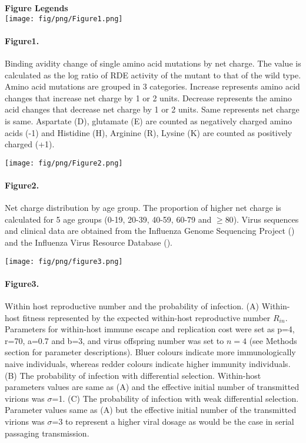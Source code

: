 \documentclass[12pt,a4paper]{article}
\begin{document}
{\bf Figure Legends} \\

\texttt{[image: fig/png/Figure1.png]}
\paragraph*{Figure1.}
\label{Fig1}
Binding avidity change of single amino acid mutations by net charge. The value is calculated as the log ratio of RDE activity of the mutant to that of the wild type. Amino acid mutations are grouped in 3 categories. Increase represents amino acid changes that increase net charge by 1 or 2 units. Decrease represents the amino acid changes that decrease net charge by 1 or 2 units. Same represents net charge is same. Aspartate (D), glutamate (E) are counted as negatively charged amino acids (-1) and Histidine (H), Arginine (R), Lysine (K) are counted as positively charged (+1).
\clearpage


\texttt{[image: fig/png/Figure2.png]} 
\paragraph*{Figure2.}
\label{Fig2}
Net charge distribution by age group. The proportion of higher net charge is calculated for 5 age groups (0-19, 20-39, 40-59, 60-79 and $\geq80$). Virus sequences and clinical data are obtained from the Influenza Genome Sequencing Project (\cite{Ghedin2005}) and the Influenza Virus Resource Database (\cite{Bao2008}). 
\clearpage

\texttt{[image: fig/png/figure3.png]}
\paragraph*{Figure3.}
\label{Fig3}
Within host reproductive number and the probability of infection. (A) Within-host fitness represented by the expected within-host reproductive number $R_{in}$. Parameters for within-host immune escape and replication cost were set as p=4, r=70, a=0.7 and b=3, and virus offspring number was set to $n=4$ (see Methods section for parameter descriptions). Bluer colours indicate more immunologically naive individuals, whereas redder colours indicate higher immunity individuals. (B) The probability of infection with differential selection. Within-host parameters values are same as (A) and the effective initial number of transmitted virions was $\sigma$=1. (C) The probability of infection with weak differential selection. Parameter values same as (A) but the effective initial number of the transmitted virions was $\sigma$=3 to represent a higher viral dosage as would be the case in serial passaging transmission.
\clearpage
\end{document}
